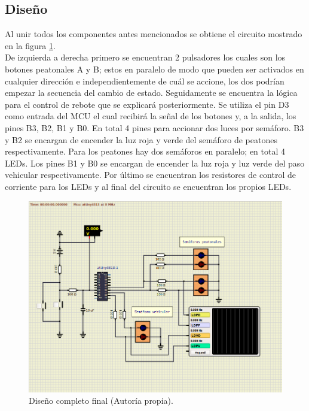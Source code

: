 \newpage
\subsection{Diseño}

Al unir todos los componentes antes mencionados se obtiene el circuito mostrado en la figura \ref{circuito_final}.\\
De izquierda a derecha primero se encuentran 2 pulsadores los cuales son los botones peatonales A y B; estos en paralelo de modo que pueden ser activados en cualquier dirección e independientemente de cuál se accione, los dos podrían empezar la secuencia del cambio de estado. Seguidamente se encuentra la lógica para el control de rebote que se explicará posteriormente. Se utiliza el pin D3 como entrada del MCU el cual recibirá la señal de los botones y, a la salida, los pines B3, B2, B1 y B0. En total 4 pines para accionar dos luces por semáforo. B3 y B2 se encargan de encender la luz roja y verde del semáforo de peatones respectivamente. Para los peatones hay dos semáforos en paralelo; en total 4 LEDs. Los pines B1 y B0 se encargan de encender la luz roja y luz verde del paso vehicular respectivamente. Por último se encuentran los resistores de control de corriente para los LEDs y al final del circuito se encuentran los propios LEDs.

\begin{figure}[H]
\centering
\includegraphics[scale=0.7]{./images/semaforo_circuito.png}
\caption{Diseño completo final (Autoría propia).}
\label{circuito_final}
\end{figure}

